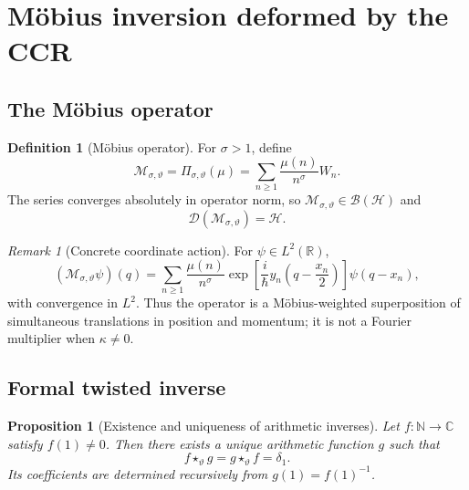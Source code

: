 \documentclass[11pt]{amsart}
\numberwithin{equation}{section}
\theoremstyle{plain}
\newtheorem{proposition}[theorem]{Proposition}
\theoremstyle{definition}
\newtheorem{definition}[theorem]{Definition}
\theoremstyle{remark}
\newtheorem{remark}[theorem]{Remark}
\newcommand{\R}{\mathbb{R}}
\newcommand{\C}{\mathbb{C}}
\newcommand{\N}{\mathbb{N}}
\newcommand{\Hil}{\mathcal{H}}
\newcommand{\Dom}{\mathcal{D}}
\newcommand{\Bop}{\mathcal{B}}
\newcommand{\twconv}{\star_{\vartheta}}
\newcommand{\deltaone}{\delta_{1}}
\begin{document}
\section{M\"obius inversion deformed by the CCR}
\label{sec:mobius_inversion}

\subsection{The M\"obius operator}
\label{subsec:mobius_operator}

\begin{definition}[M\"obius operator]
\label{def:mobius_operator}
For $\sigma>1$, define
\begin{equation}
\mathcal M_{\sigma,\vartheta}
=
\Pi_{\sigma,\vartheta}(\mu)
=
\sum_{n\ge1}
\frac{\mu(n)}{n^{\sigma}}W_n.
\label{eq:mobius_operator}
\end{equation}
The series converges absolutely in operator norm, so
$\mathcal M_{\sigma,\vartheta}\in\Bop(\Hil)$ and
\begin{equation}
\Dom(\mathcal M_{\sigma,\vartheta})=\Hil.
\label{eq:mobius_operator_domain}
\end{equation}
\end{definition}

\begin{remark}[Concrete coordinate action]
\label{rem:mobius_coordinate_action}
For $\psi\in L^2(\R)$,
\begin{equation}
(\mathcal M_{\sigma,\vartheta}\psi)(q)
=
\sum_{n\ge1}
\frac{\mu(n)}{n^{\sigma}}
\exp\!\left[
\frac{i}{\hbar}y_n\left(q-\frac{x_n}{2}\right)
\right]
\psi(q-x_n),
\label{eq:mobius_coordinate_action}
\end{equation}
with convergence in $L^2$.  Thus the operator is a M\"obius-weighted
superposition of simultaneous translations in position and momentum; it is
not a Fourier multiplier when $\kappa\neq0$.
\end{remark}

\subsection{Formal twisted inverse}
\label{subsec:formal_twisted_inverse}

\begin{proposition}[Existence and uniqueness of arithmetic inverses]
\label{prop:formal_inverse}
Let $f:\N\to\C$ satisfy $f(1)\neq0$.  Then there exists a unique arithmetic
function $g$ such that
\begin{equation}
f\twconv g=g\twconv f=\deltaone.
\label{eq:two_sided_inverse}
\end{equation}
Its coefficients are determined recursively from $g(1)=f(1)^{-1}$.
\end{proposition}
\end{document}
